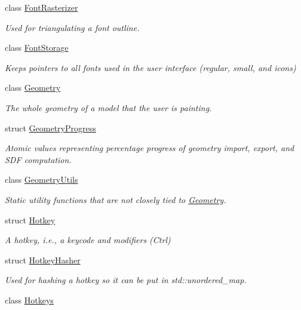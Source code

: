 \begin{DoxyCompactItemize}
class \mbox{\hyperlink{classpepr3d_1_1_font_rasterizer}{Font\+Rasterizer}}
\begin{DoxyCompactList}\small\item\em Used for triangulating a font outline. \end{DoxyCompactList}\item 
class \mbox{\hyperlink{classpepr3d_1_1_font_storage}{Font\+Storage}}
\begin{DoxyCompactList}\small\item\em Keeps pointers to all fonts used in the user interface (regular, small, and icons) \end{DoxyCompactList}\item 
class \mbox{\hyperlink{classpepr3d_1_1_geometry}{Geometry}}
\begin{DoxyCompactList}\small\item\em The whole geometry of a model that the user is painting. \end{DoxyCompactList}\item 
struct \mbox{\hyperlink{structpepr3d_1_1_geometry_progress}{Geometry\+Progress}}
\begin{DoxyCompactList}\small\item\em Atomic values representing percentage progress of geometry import, export, and S\+DF computation. \end{DoxyCompactList}\item 
class \mbox{\hyperlink{classpepr3d_1_1_geometry_utils}{Geometry\+Utils}}
\begin{DoxyCompactList}\small\item\em Static utility functions that are not closely tied to \mbox{\hyperlink{classpepr3d_1_1_geometry}{Geometry}}. \end{DoxyCompactList}\item 
struct \mbox{\hyperlink{structpepr3d_1_1_hotkey}{Hotkey}}
\begin{DoxyCompactList}\small\item\em A hotkey, i.\+e., a keycode and modifiers (Ctrl) \end{DoxyCompactList}\item 
struct \mbox{\hyperlink{structpepr3d_1_1_hotkey_hasher}{Hotkey\+Hasher}}
\begin{DoxyCompactList}\small\item\em Used for hashing a hotkey so it can be put in std\+::unordered\+\_\+map. \end{DoxyCompactList}\item 
class \mbox{\hyperlink{classpepr3d_1_1_hotkeys}{Hotkeys}}

\end{DoxyCompactItemize}
